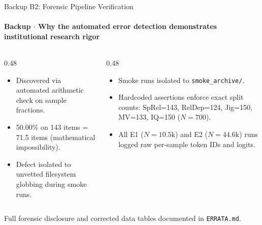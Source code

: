 \documentclass[aspectratio=169, 10pt]{beamer}
\begin{document}
\begin{frame}{Backup B2: Forensic Pipeline Verification}
  \framesubtitle{Backup $\cdot$ Why the automated error detection demonstrates institutional research rigor}
  
  \begin{columns}[T]
    \begin{column}{0.48\textwidth}
      \begin{tcolorbox}[metriccard, title=\textbf{How Bug Was Detected}]
        \small
        \begin{itemize}\setlength{\itemsep}{2pt}
          \item Discovered via automated arithmetic check on sample fractions.
          \item 50.00\% on 143 items = 71.5 items (mathematical impossibility).
          \item Defect isolated to unvetted filesystem globbing during smoke runs.
        \end{itemize}
      \end{tcolorbox}
    \end{column}
    
    \begin{column}{0.48\textwidth}
      \begin{tcolorbox}[successcard, title=\textbf{Standing Pipeline Assertions}]
        \small
        \begin{itemize}\setlength{\itemsep}{2pt}
          \item Smoke runs isolated to \texttt{smoke\_archive/}.
          \item Hardcoded assertions enforce exact split counts: SpRel=143, RelDep=124, Jig=150, MV=133, IQ=150 ($N=700$).
          \item All E1 ($N=10.5\text{k}$) and E2 ($N=44.6\text{k}$) runs logged raw per-sample token IDs and logits.
        \end{itemize}
      \end{tcolorbox}
    \end{column}
  \end{columns}
  
  \vspace{6pt}
  \begin{tcolorbox}[accentcard]
    \centering \small Full forensic disclosure and corrected data tables documented in \texttt{ERRATA.md}.
  \end{tcolorbox}

\end{frame}
\end{document}
